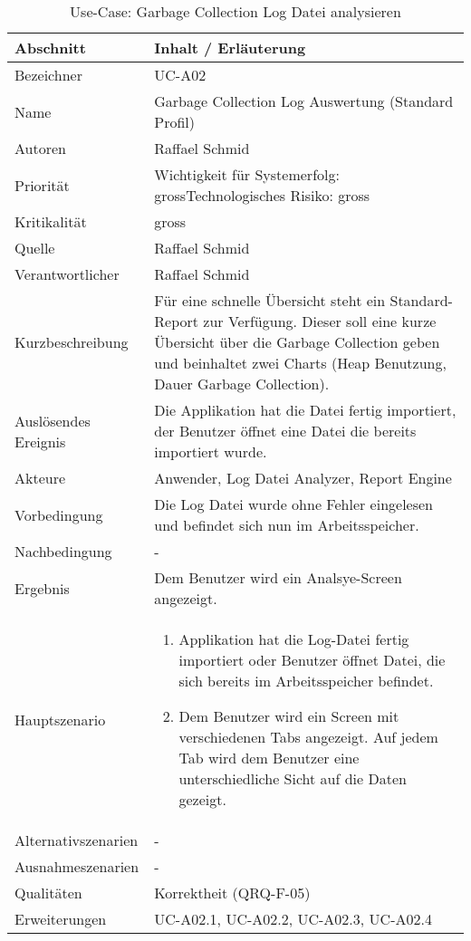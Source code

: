 \begin{longtable}{|p{4cm}|p{10.5cm}|}
\caption{Use-Case: Garbage Collection Log Datei analysieren}\\\hline
   \textbf{Abschnitt} & \textbf{Inhalt / Erläuterung} \\\hline
   Bezeichner & UC-A02\\\hline
   Name & Garbage Collection Log Auswertung (Standard Profil)\\\hline
   Autoren & Raffael Schmid\\\hline
   Priorität & Wichtigkeit für Systemerfolg: gross\newline Technologisches Risiko: gross\\\hline
   Kritikalität & gross\\\hline
   Quelle & Raffael Schmid\\\hline
   Verantwortlicher & Raffael Schmid\\\hline
   Kurzbeschreibung & Für eine schnelle Übersicht steht ein Standard-Report zur Verfügung. Dieser soll eine kurze Übersicht über die Garbage Collection geben und beinhaltet zwei Charts (Heap Benutzung, Dauer Garbage Collection). \\\hline
   Auslösendes Ereignis & Die Applikation hat die Datei fertig importiert, der Benutzer öffnet eine Datei die bereits importiert wurde.\\\hline
   Akteure & Anwender, Log Datei Analyzer, Report Engine\\\hline
   Vorbedingung & Die Log Datei wurde ohne Fehler eingelesen und befindet sich nun im Arbeitsspeicher.\\\hline
   Nachbedingung & -\\\hline
   Ergebnis & Dem Benutzer wird ein Analsye-Screen angezeigt.\\\hline
   Hauptszenario & 
	\begin{enumerate}
		\item Applikation hat die Log-Datei fertig importiert oder Benutzer öffnet Datei, die sich bereits im Arbeitsspeicher befindet.
		\item Dem Benutzer wird ein Screen mit verschiedenen Tabs angezeigt. Auf jedem Tab wird dem Benutzer eine unterschiedliche Sicht auf die Daten gezeigt.
	\end{enumerate}
	\\\hline
   Alternativszenarien & -\\\hline
   Ausnahmeszenarien & -\\\hline
   Qualitäten & Korrektheit (QRQ-F-05)\\\hline
   Erweiterungen & UC-A02.1, UC-A02.2, UC-A02.3, UC-A02.4 \\\hline
\end{longtable}


